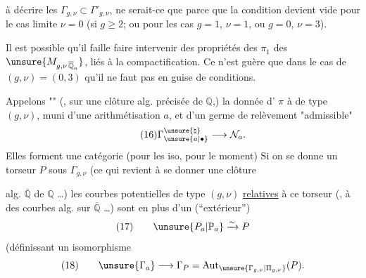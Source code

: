 

 à décrire les 
$\Gamma_{g,\nu}\subset\Gamma'_{g,\nu}$,
ne serait-ce que parce que la condition
devient vide pour  le cas limite $\nu=0$
(si $g\geq2$; ou pour les cas $g=1$, $\nu=1$, ou $g=0$, $\nu=3$).

Il est possible qu'il faille faire
intervenir des propriétés des $\pi_1$ des
$\unsure{M_{g,\nu\,\overline{\mathbb Q}_a}}$, liés à la compactification.
Ce n'est guère que dans le cas de
$(g,\nu)=(0,3)$ qu'il ne faut pas 
 en guise de conditions.

Appelons ""
(, sur une clôture alg.  précisée de $\mathbb Q$,)
la donnée d' 
$\pi$ à  
de type $(g,\nu)$, muni d'une arithmétisation
$a$, et d'un germe de relèvement
"admissible"
\[
\tag{16}
\Gamma_{\unsure{a|\bullet}}^{\unsure{\natural}}
\longrightarrow\mathcal N_a.
\]
Elles forment une catégorie (pour les
iso, pour le moment) Si on se
donne un torseur $P$ sous $\Gamma_{g,\nu}$
(ce qui  revient à se donner une clôture


alg. $\overline{\mathbb Q}$ de $\mathbb Q$ \ldots) les courbes potentielles
de type $(g,\nu)$ \uline{relatives} à ce torseur
(,  à des courbes
alg. sur $\overline{\mathbb Q}$ \ldots) sont   en
plus d'un  (``extérieur'')
\[
(17)\qquad \unsure{P_a|\mathbb P_a}\xrightarrow{\sim}P
\]
(définissant un isomorphisme
\[
(18)\qquad \unsure{\Gamma_a}\longrightarrow\Gamma_P
 =\operatorname{Aut}_{\unsure{\Gamma_{g,\nu}|\Pi_{g,\nu}}}(P).
\]


